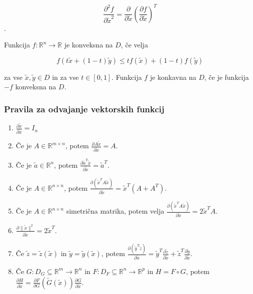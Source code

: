 \documentclass{article}
\begin{document}
\begin{multicols}{2}
\[ 
\frac{\partial^2 f}{\partial \tilde{x}^2} = \frac{\partial}{\partial \tilde{x}} \left( \frac{\partial f}{\partial \tilde{x}} \right)^T 
\].

Funkcija \( f: \mathbb{R}^n \rightarrow \mathbb{R} \) je konveksna na \( D \), če velja

\[ 
f(t \tilde{x} + (1-t) \tilde{y}) \leq t f(\tilde{x}) + (1-t) f(\tilde{y}) 
\]

za vse \( \tilde{x}, \tilde{y} \in D \) in za vse \( t \in [0, 1] \). Funkcija \( f \) je konkavna na \( D \), če je funkcija \( -f \) konveksna na \( D \).

\subsubsection{Pravila za odvajanje vektorskih funkcij}

\begin{enumerate}
    \item \(\frac{\partial \tilde{x}}{\partial \tilde{x}} = I_n\)
    \item Če je \( A \in \mathbb{R}^{m \times n} \), potem \( \frac{\partial A\tilde{x}}{\partial \tilde{x}} = A \).
    \item Če je \( \tilde{a} \in \mathbb{R}^n \), potem \( \frac{\partial \tilde{a}^T\tilde{x}}{\partial \tilde{x}} = \tilde{a}^T \).
    \item Če je \( A \in \mathbb{R}^{n \times n} \), potem \( \frac{\partial (\tilde{x}^T A\tilde{x})}{\partial \tilde{x}} = \tilde{x}^T(A + A^T) \).
    \item Če je \( A \in \mathbb{R}^{n \times n} \) simetrična matrika, potem velja \( \frac{\partial (\tilde{x}^T A\tilde{x})}{\partial \tilde{x}} = 2\tilde{x}^T A \).
    \item \( \frac{\partial \|\tilde{x}\|^2}{\partial \tilde{x}} = 2\tilde{x}^T \).
    \item Če \( \tilde{z} = \tilde{z}(\tilde{x}) \) in \( \tilde{y} = \tilde{y}(\tilde{x}) \), potem \( \frac{\partial (\tilde{y}^T \tilde{z})}{\partial \tilde{x}} = \tilde{y}^T \frac{\partial \tilde{z}}{\partial \tilde{x}} + \tilde{z}^T \frac{\partial \tilde{y}}{\partial \tilde{x}} \).
    \item Če \( G: D_G \subseteq \mathbb{R}^m \rightarrow \mathbb{R}^n \) in \( F: D_F \subseteq \mathbb{R}^n \rightarrow \mathbb{R}^p \) in \( H = F \circ G \), potem \( \frac{\partial H}{\partial \tilde{x}} = \frac{\partial F}{\partial G} (\tilde{G}(\tilde{x})) \frac{\partial G}{\partial \tilde{x}} \).
\end{enumerate}



\end{multicols}
\end{document}
